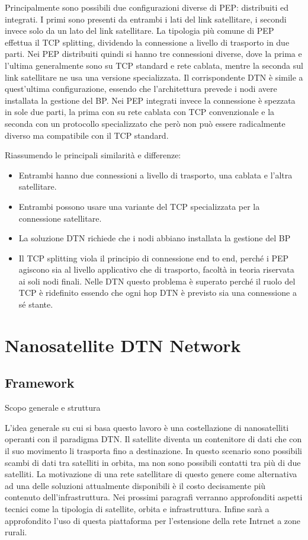 \documentclass[a4paper]{article}
\begin{document}
		Principalmente sono possibili due configurazioni diverse di PEP: distribuiti ed integrati. I primi sono presenti da entrambi i lati del link satellitare, i secondi invece solo da un lato del link satellitare. 
		La tipologia più comune di PEP effettua il TCP splitting, dividendo la connessione a livello di trasporto in due parti. Nei PEP distribuiti quindi si hanno tre connessioni diverse, dove la prima e l'ultima generalmente sono su TCP standard e rete cablata, mentre la seconda sul link satellitare ne usa una versione specializzata.
		Il corrispondente DTN è simile a quest'ultima configurazione, essendo che l'architettura prevede i nodi avere installata la gestione del BP.
		Nei PEP integrati invece la connessione è spezzata in sole due parti, la prima con su rete cablata con TCP convenzionale e la seconda con un protocollo specializzato che però non può essere radicalmente diverso ma compatibile con il TCP standard.
		
		Riassumendo le principali similarità e differenze:
		\begin{itemize}
			\item Entrambi hanno due connessioni a livello di trasporto, una cablata e l'altra satellitare.
			\item Entrambi possono usare una variante del TCP specializzata per la connessione satellitare.
			\item La soluzione DTN richiede che i nodi abbiano installata la gestione del BP
			\item Il TCP splitting viola il principio di connessione end to end, perché i PEP agiscono sia al livello applicativo che di trasporto, facoltà in teoria riservata ai soli nodi finali. Nelle DTN questo problema è superato perché il ruolo del TCP è ridefinito essendo che ogni hop DTN è previsto sia una connessione a sé stante.
 		\end{itemize}
		
		
	
	\section{Nanosatellite DTN Network}
		
		\subsection{Framework}
		{\sc Scopo generale e struttura}

		L'idea generale su cui si basa questo lavoro è una costellazione di nanosatelliti operanti con il paradigma DTN. Il satellite diventa un contenitore di dati che con il suo movimento li trasporta fino a destinazione. In questo scenario sono possibili scambi di dati tra satelliti in orbita, ma non sono possibili contatti tra più di due satelliti. La motivazione di una rete satellitare di questo genere come alternativa ad una delle soluzioni attualmente disponibili è il costo decisamente più contenuto dell'infrastruttura. Nei prossimi paragrafi verranno approfonditi aspetti tecnici come la tipologia di satellite, orbita e infrastruttura. Infine sarà a approfondito l'uso di questa piattaforma per l'estensione della rete Intrnet a zone rurali.
		
\end{document}
